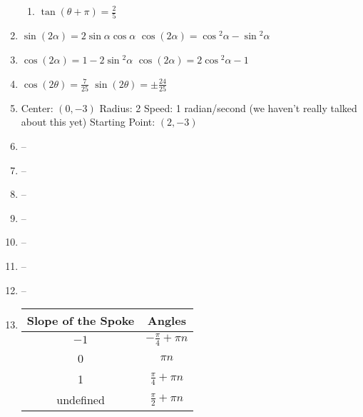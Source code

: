 \documentclass{article}
\begin{document}
\begin{enumerate}
\begin{enumerate}
	\item $\tan{(\theta + \pi)} = \frac{2}{5}$
	
	\end{enumerate}
	
\item $\sin{(2\alpha)} = 2 \sin{\alpha} \cos{\alpha}$ \newline
	$\cos{(2\alpha)} = \cos{^2\alpha} - \sin{^2\alpha}$

\item $\cos{(2 \alpha)} = 1 - 2 \sin{^2 \alpha}$ \newline
	$\cos{(2 \alpha)} = 2 \cos{^2 \alpha} - 1$

\item $\cos{(2 \theta)} = \frac{7}{25}$ \newline
	$\sin{(2 \theta)} = \pm \frac{24}{25}$

\item Center: $(0, -3)$ \newline
	Radius: 2 \newline
	Speed: 1 radian/second (we haven't really talked about this yet) \newline
	Starting Point: $(2, -3)$
	
\item --

\item -- 

\item --

\item --

\item --

\item --

\item --

\item 

	\begin{tabular}{| c | c |}
	
	\hline
	
	Slope of the Spoke & Angles \\
	
	\hline
	
	$-1$ & $-\frac{\pi}{4} + \pi n$ \\
	
	\hline
	
	0 & $\pi n$ \\
	
	\hline
	
	1 & $\frac{\pi}{4} + \pi n$ \\
	
	\hline
	
	undefined & $\frac{\pi}{2} + \pi n$ \\
	
	\hline
	
	\end{tabular}

\end{enumerate}
\end{document}
